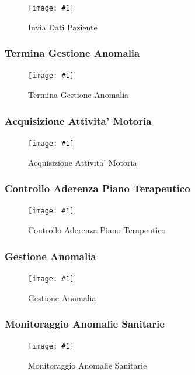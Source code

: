 \documentclass[a4paper,11pt,oneside, table]{article}
\newcommand{\putimage}[4] {
	\begin{figure}[H]
	    \centering
	    \texttt{[image: \#1]}
	    \caption{#2}\label{#3}
	\end{figure}
}
\begin{document}
\putimage{images/Diagramma di Sequenza/Invia Dati Paziente.png}{Invia Dati Paziente}{png:invia-dati-paziente}{1}


\subsubsection{Termina Gestione Anomalia}

\putimage{images/Diagramma di Sequenza/Termina Gestione Anomalia.png}{Termina Gestione Anomalia}{png:termina-gestione-anomalia}{1}


\subsubsection{Acquisizione Attivita' Motoria}

\putimage{images/Diagramma di Sequenza/Acquisizione Attivita' Motoria.png}{Acquisizione Attivita' Motoria}{png:acquisizione-attivita-motoria}{1}


\subsubsection{Controllo Aderenza Piano Terapeutico}

\putimage{images/Diagramma di Sequenza/Controllo Aderenza Piano Terapeutico.png}{Controllo Aderenza Piano Terapeutico}{png:controllo-aderenza-piano-terapeutico}{1}


\subsubsection{Gestione Anomalia}

\putimage{images/Diagramma di Sequenza/Gestione Anomalia.png}{Gestione Anomalia}{png:gestione-anomalia}{1}


\subsubsection{Monitoraggio Anomalie Sanitarie}

\putimage{images/Diagramma di Sequenza/Monitoraggio Anomalie Sanitarie.png}{Monitoraggio Anomalie Sanitarie}{png:monitoraggio-anomalie-sanitarie}{1}
\end{document}
